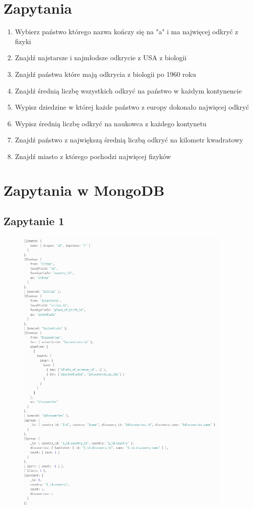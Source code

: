 \documentclass[11pt]{article}
\begin{document}
\section{Zapytania}
	\begin{enumerate}
		\item  Wybierz państwo którego nazwa kończy się na "a" i ma najwięcej odkryć z fizyki
		\item Znajdź najstarsze i najmłodsze odkrycie z USA z biologii
		\item Znajdź państwa które mają odkrycia z biologii po 1960 roku
		\item Znajdź średnią liczbę wszystkich odkryć na państwo w każdym kontynencie
		\item  Wypisz dziedzine w której każde państwo z europy dokonało najwięcej odkryć
		\item  Wypisz średnią liczbę odkryć na naukowca z każdego kontynetu
		\item  Znajdź państwo z największą średnią liczbą odkryć na kilometr kwadratowy
		\item Znajdź miasto z którego pochodzi najwięcej fizyków
	\end{enumerate}

\newpage
\section{Zapytania w MongoDB}
	\subsection{Zapytanie 1}
		\begin{figure}[!ht]
			\begin{center}
				\includegraphics[width=400px]{m1.png}
			\end{center}
		\end{figure}
\end{document}

